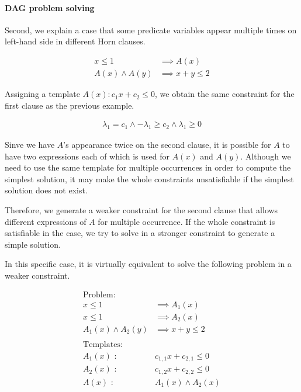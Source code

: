 \documentclass[a4paper,12pt]{article}
\begin{document}
\paragraph {DAG problem solving}
Second, we explain a case that some predicate variables appear
multiple times on left-hand side in different Horn clauses.

\begin{align*}
x \leq 1 & \implies A(x) \\
A(x) \wedge A(y) & \implies x+y \leq 2
\end{align*}

Assigning a template $A(x) : c_1 x + c_2 \leq 0$, we obtain the same
constraint for the first clause as the previous example.

\begin{align} \label{eq:constr1}
\lambda_1 = c_1 \wedge - \lambda_1 \geq c_2 \wedge \lambda_1 \geq 0
\end{align}

Sinve we have $A$'s appearance twice on the second clause, it is
possible for $A$ to have two expressions each of which is used for
$A(x)$ and $A(y)$.  Although we need to use the same template for
multiple occurrences in order to compute the simplest solution, it may
make the whole constraints unsatisfiable if the simplest solution does
not exist.

Therefore, we generate a weaker constraint for the second clause that
allows different expressions of $A$ for multiple occurrence.  If the
whole constraint is satisfiable in the case, we try to solve in a
stronger constraint to generate a simple solution.

In this specific case, it is virtually equivalent to solve the
following problem in a weaker constraint.

\begin{align*}
\text{Problem:} \\
x \leq 1 & \implies A_1(x) \\
x \leq 1 & \implies A_2(x) \\
A_1(x) \wedge A_2(y) & \implies x+y \leq 2 \\
\\
\text{Templates:} \\
A_1(x) \text{ : } & c_{1,1} x + c_{2,1} \leq 0 \\
A_2(x) \text{ : } & c_{1,2} x + c_{2,2} \leq 0 \\
A(x) \text{ : } & A_1(x) \wedge A_2(x) \\
\end{align*}
\end{document}
